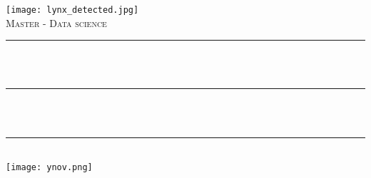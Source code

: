 
\begin{titlepage}
    \centering
    \vspace*{-3.5 cm}
    \texttt{[image: lynx\_detected.jpg]}\\[1.0 cm]
    \textsc{\Large Master - Data science}\\[0.5 cm]     
    \rule{\linewidth}{0.2 mm} \\[0.4 cm]
    { \huge \bfseries \theauthor}\\
    \rule{\linewidth}{0.2 mm} \\[0.4 cm]
    { \huge \bfseries \thetitle}\\
    \rule{\linewidth}{0.2 mm} \\[1.5 cm]
    \texttt{[image: ynov.png]}\\[1.0 cm]  %
\end{titlepage}